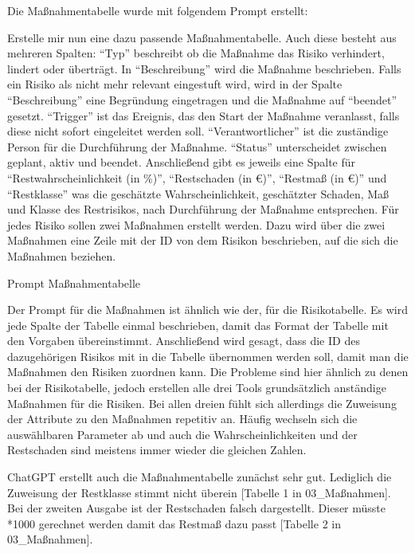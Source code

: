 Die Maßnahmentabelle wurde mit folgendem Prompt erstellt:

\begin{prompt}[H]
    \begin{tcolorbox}[colback=gray!20, colframe=gray!20, boxrule=0pt, sharp corners] 
        Erstelle mir nun eine dazu passende Maßnahmentabelle. Auch diese besteht aus mehreren Spalten: ``Typ'' beschreibt 
        ob die Maßnahme das Risiko verhindert, lindert oder überträgt. In ``Beschreibung'' wird die Maßnahme beschrieben. 
        Falls ein Risiko als nicht mehr relevant eingestuft wird, wird in der Spalte ``Beschreibung'' eine Begründung 
        eingetragen und die Maßnahme auf ``beendet'' gesetzt. ``Trigger'' ist das Ereignis, das den Start der Maßnahme 
        veranlasst, falls diese nicht sofort eingeleitet werden soll. ``Verantwortlicher'' ist die zuständige Person für 
        die Durchführung der Maßnahme. ``Status'' unterscheidet zwischen geplant, aktiv und beendet. Anschließend gibt es 
        jeweils eine Spalte für ``Restwahrscheinlichkeit (in \%)'', ``Restschaden (in €)'', ``Restmaß (in €)'' und ``Restklasse'' 
        was die geschätzte Wahrscheinlichkeit, geschätzter Schaden, Maß und Klasse des Restrisikos, nach Durchführung der 
        Maßnahme entsprechen. Für jedes Risiko sollen zwei Maßnahmen erstellt werden. Dazu wird über die zwei Maßnahmen 
        eine Zeile mit der ID von dem Risikon beschrieben, auf die sich die Maßnahmen beziehen.
        \vfill
    \end{tcolorbox}
    \caption{Prompt Maßnahmentabelle}
    \label{Prompt Maßnahmentabelle}
\end{prompt}

Der Prompt für die Maßnahmen ist ähnlich wie der, für die Risikotabelle. Es wird jede Spalte der Tabelle einmal beschrieben,
damit das Format der Tabelle mit den Vorgaben übereinstimmt. Anschließend wird gesagt, dass die ID des dazugehörigen Risikos
mit in die Tabelle übernommen werden soll, damit man die Maßnahmen den Risiken zuordnen kann. Die Probleme sind hier 
ähnlich zu denen bei der Risikotabelle, jedoch erstellen alle drei Tools grundsätzlich anständige Maßnahmen für die Risiken.
Bei allen dreien fühlt sich allerdings die Zuweisung der Attribute zu den Maßnahmen repetitiv an. Häufig wechseln sich die 
auswählbaren Parameter ab und auch die Wahrscheinlichkeiten und der Restschaden sind meistens immer wieder die gleichen Zahlen.

ChatGPT erstellt auch die Maßnahmentabelle zunächst sehr gut. Lediglich die Zuweisung der Restklasse stimmt nicht überein 
[Tabelle 1 in 03\_Maßnahmen]. Bei der zweiten Ausgabe ist der Restschaden falsch dargestellt. Dieser müsste *1000 gerechnet 
werden damit das Restmaß dazu passt [Tabelle 2 in 03\_Maßnahmen].

